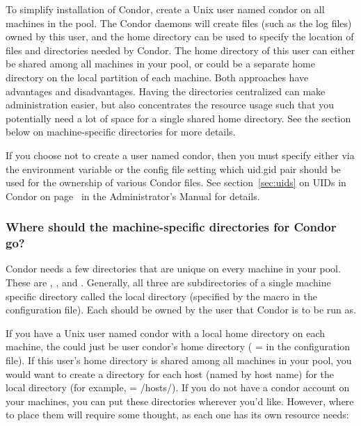 To simplify installation of Condor,
create a Unix user named condor on all machines in the pool.
The Condor daemons will create files
(such as the log files) owned by this user,
and the home directory can be used to specify the location of files
and directories needed by Condor.  The home directory of this user can
either be shared among all machines in your pool, or could be a
separate home directory on the local partition of each machine.  Both
approaches have advantages and disadvantages.  Having the directories
centralized can make administration easier, but also concentrates the
resource usage such that you potentially need a lot of space for a
single shared home directory.  See the section below on
machine-specific directories for more details.

If you choose not to create a user named condor,
then you must specify either via the
 environment variable or the 
config file setting which uid.gid pair should be used for
the ownership of various Condor files.  
See section~\ref{sec:uids} on UIDs in Condor on
page~\pageref{sec:uids} in the Administrator's Manual for details.

\subsubsection{Where should the machine-specific directories for
Condor go?} 

Condor needs a few directories that are unique on every machine in
your pool.  These are 
, 
, and 
.  Generally, all
three are subdirectories of a single machine specific directory called
the local directory (specified by the  macro
in the configuration file).
Each should be owned by the user that Condor is to be run as.

If you have a Unix user named condor with a local home directory on each
machine, the  could just be user condor's home
directory ( =  in the 
configuration file).
If this user's home directory is shared among all machines in your
pool, you would want to create a directory for each host (named by
host name) for the local directory (for example,  =
/hosts/).  If you do not
have a condor account on your machines, you can put these directories
wherever you'd like.
However, where to place them will require some
thought, as each one has its own resource needs:

